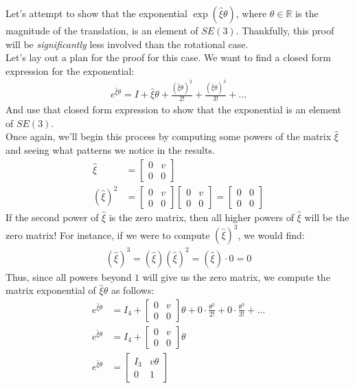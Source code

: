 \documentclass[oneside]{book}
\begin{document}
Let's attempt to show that the exponential $\exp(\hat\xi\theta)$, where $\theta \in\mathbb{R}$ is the magnitude of the translation, is an element of $SE(3)$. Thankfully, this proof will be \textit{significantly} less involved than the rotational case.\\
Let's lay out a plan for the proof for this case. We want to find a closed form expression for the exponential:
\begin{align}
    e^{\hat\xi\theta} = I + \hat\xi\theta + \frac{(\hat\xi\theta)^2}{2!} + \frac{(\hat\xi\theta)^3}{3!} + ...
\end{align}
And use that closed form expression to show that the exponential is an element of $SE(3)$.\\
Once again, we'll begin this process by computing some powers of the matrix $\hat\xi$ and seeing what patterns we notice in the results.
\begin{align}
    \hat\xi &= 
    \begin{bmatrix}
        0 & v\\
        0 & 0
    \end{bmatrix}\\
    (\hat\xi)^2 &= 
    \begin{bmatrix}
        0 & v\\
        0 & 0
    \end{bmatrix}
    \begin{bmatrix}
        0 & v\\
        0 & 0
    \end{bmatrix}
    = \begin{bmatrix}
        0 & 0\\
        0 & 0
    \end{bmatrix}
\end{align}
If the second power of $\hat\xi$ is the zero matrix, then all higher powers of $\hat\xi$ will be the zero matrix! For instance, if we were to compute $(\hat\xi)^3$, we would find:
\begin{align}
    (\hat\xi)^3 = (\hat\xi)(\hat\xi)^2 = (\hat\xi)\cdot0 = 0
\end{align}
Thus, since all powers beyond $1$ will give us the zero matrix, we compute the matrix exponential of $\hat\xi\theta$ as follows:
\begin{align}
    e^{\hat\xi\theta} &= I_4 + \begin{bmatrix}
        0 & v\\
        0 & 0
    \end{bmatrix}\theta
    + 0\cdot\frac{\theta^2}{2!} + 0\cdot\frac{\theta^3}{3!} + ...\\
    e^{\hat\xi\theta} &= I_4 + \begin{bmatrix}
        0 & v\\
        0 & 0
    \end{bmatrix}\theta\\
    e^{\hat\xi\theta} &=
    \begin{bmatrix}
        I_3 & v\theta\\
        0 & 1
    \end{bmatrix}
\end{align}
\end{document}
